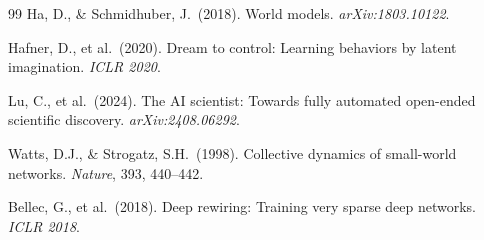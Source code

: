 \documentclass[12pt]{article}
\begin{document}
\begin{thebibliography}{99}
 Ha, D., \& Schmidhuber, J.\ (2018). World models. \textit{arXiv:1803.10122}.

 Hafner, D., et al.\ (2020). Dream to control: Learning behaviors by latent imagination. \textit{ICLR 2020}.

 Lu, C., et al.\ (2024). The AI scientist: Towards fully automated open-ended scientific discovery. \textit{arXiv:2408.06292}.

 Watts, D.J., \& Strogatz, S.H.\ (1998). Collective dynamics of small-world networks. \textit{Nature}, 393, 440--442.

 Bellec, G., et al.\ (2018). Deep rewiring: Training very sparse deep networks. \textit{ICLR 2018}.

\end{thebibliography}
\end{document}
